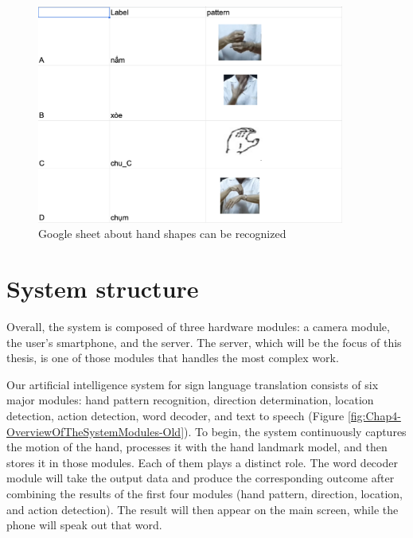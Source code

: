 \begin{figure}[H]
	\centering
	\includegraphics[width=0.9\textwidth]{img/Chap4/Sheet-Pattern.png}
	\caption{Google sheet about hand shapes can be recognized}
	\label{fig:Chap4-Sheet-Pattern}
\end{figure}



\section{System structure}

Overall, the system is composed of three hardware modules: a camera module, the user's smartphone, and the server. The server, which will be the focus of this thesis, is one of those modules that handles the most complex work.

Our artificial intelligence system for sign language translation consists of six major modules: hand pattern recognition, direction determination, location detection, action detection, word decoder, and text to speech (Figure \ref{fig:Chap4-OverviewOfTheSystemModules-Old}). To begin, the system continuously captures the motion of the hand, processes it with the hand landmark model, and then stores it in those modules. Each of them plays a distinct role. The word decoder module will take the output data and produce the corresponding outcome after combining the results of the first four modules (hand pattern, direction, location, and action detection). The result will then appear on the main screen, while the phone will speak out that word.

